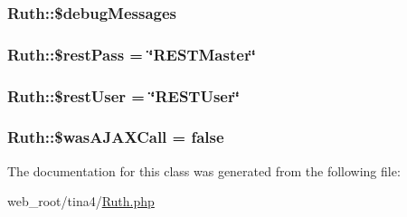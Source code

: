 \subsubsection[{\$debug\+Messages}]{\setlength{\rightskip}{0pt plus 5cm}Ruth\+::\$debug\+Messages\hspace{0.3cm}{\ttfamily [static]}}\label{classRuth_abcc2411c11abe0c3675069f255db1f97}
\hypertarget{classRuth_ab4e553a88d7384c2dd07158efe3dd933}{}
\subsubsection[{\$rest\+Pass}]{\setlength{\rightskip}{0pt plus 5cm}Ruth\+::\$rest\+Pass = \char`\"{}R\+E\+S\+T\+Master\char`\"{}\hspace{0.3cm}{\ttfamily [static]}}\label{classRuth_ab4e553a88d7384c2dd07158efe3dd933}
\hypertarget{classRuth_abe139defb62f176c0a077983561f9d86}{}
\subsubsection[{\$rest\+User}]{\setlength{\rightskip}{0pt plus 5cm}Ruth\+::\$rest\+User = \char`\"{}R\+E\+S\+T\+User\char`\"{}\hspace{0.3cm}{\ttfamily [static]}}\label{classRuth_abe139defb62f176c0a077983561f9d86}
\hypertarget{classRuth_aaaf0e436f08cbd148c492584832da4cc}{}
\subsubsection[{\$was\+A\+J\+A\+X\+Call}]{\setlength{\rightskip}{0pt plus 5cm}Ruth\+::\$was\+A\+J\+A\+X\+Call = {\bf false}\hspace{0.3cm}{\ttfamily [static]}}\label{classRuth_aaaf0e436f08cbd148c492584832da4cc}


The documentation for this class was generated from the following file\+:\begin{DoxyCompactItemize}
\item 
web\+\_\+root/tina4/\hyperlink{Ruth_8php}{Ruth.\+php}\end{DoxyCompactItemize}
